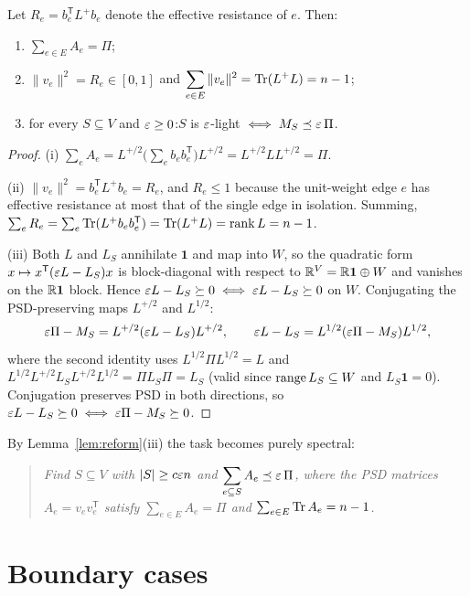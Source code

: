 \begin{lemma}\label{lem:reform}
Let $R_e=b_e^{\mathsf T}L^{+}b_e$ denote the effective resistance of $e$. Then:
\begin{enumerate}[label=\textup{(\roman*)}]
\item $\displaystyle\sum_{e\in E}A_e=\Pi$;
\item $\|v_e\|^2=R_e\in[0,1]$ and $\displaystyle\sum_{e\in E}\|v_e\|^2=\operatorname{Tr}(L^{+}L)=n-1$;
\item for every $S\subseteq V$ and $\varepsilon\ge 0$:\quad $S$ is $\varepsilon$-light $\iff M_S\preceq\varepsilon\,\Pi$.
\end{enumerate}
\end{lemma}
\begin{proof}
(i) $\sum_eA_e=L^{+/2}\!\big(\sum_eb_eb_e^{\mathsf T}\big)L^{+/2}=L^{+/2}LL^{+/2}=\Pi$.

(ii) $\|v_e\|^2=b_e^{\mathsf T}L^{+}b_e=R_e$, and $R_e\le 1$ because the unit-weight edge $e$ has
effective resistance at most that of the single edge in isolation. Summing,
$\sum_eR_e=\sum_e\operatorname{Tr}(L^{+}b_eb_e^{\mathsf T})=\operatorname{Tr}(L^{+}L)=\operatorname{rank} L=n-1$.

(iii) Both $L$ and $L_S$ annihilate $\mathbf 1$ and map into $W$, so the quadratic form
$x\mapsto x^{\mathsf T}(\varepsilon L-L_S)x$ is block-diagonal with respect to
$\mathbb{R}^V=\mathbb{R}\mathbf 1\oplus W$ and vanishes on the $\mathbb{R}\mathbf 1$ block. Hence
$\varepsilon L-L_S\succeq 0\iff \varepsilon L-L_S\succeq 0$ on $W$. Conjugating the PSD-preserving
maps $L^{+/2}$ and $L^{1/2}$:
\[
\varepsilon\Pi-M_S=L^{+/2}(\varepsilon L-L_S)L^{+/2},\qquad
\varepsilon L-L_S=L^{1/2}(\varepsilon\Pi-M_S)L^{1/2},
\]
where the second identity uses $L^{1/2}\Pi L^{1/2}=L$ and
$L^{1/2}L^{+/2}L_SL^{+/2}L^{1/2}=\Pi L_S\Pi=L_S$ (valid since $\operatorname{range} L_S\subseteq W$ and
$L_S\mathbf 1=0$). Conjugation preserves PSD in both directions, so
$\varepsilon L-L_S\succeq 0\iff\varepsilon\Pi-M_S\succeq 0$.
\end{proof}

By Lemma~\ref{lem:reform}(iii) the task becomes purely spectral:

\begin{quote}
\emph{Find $S\subseteq V$ with $|S|\ge c\varepsilon n$ and
$\displaystyle\sum_{e\subseteq S}A_e\preceq\varepsilon\,\Pi$, where the PSD matrices $A_e=v_ev_e^{\mathsf T}$
satisfy $\sum_{e\in E}A_e=\Pi$ and $\sum_{e\in E}\operatorname{Tr} A_e=n-1$.}
\end{quote}

\section{Boundary cases}\label{sec:boundary}

